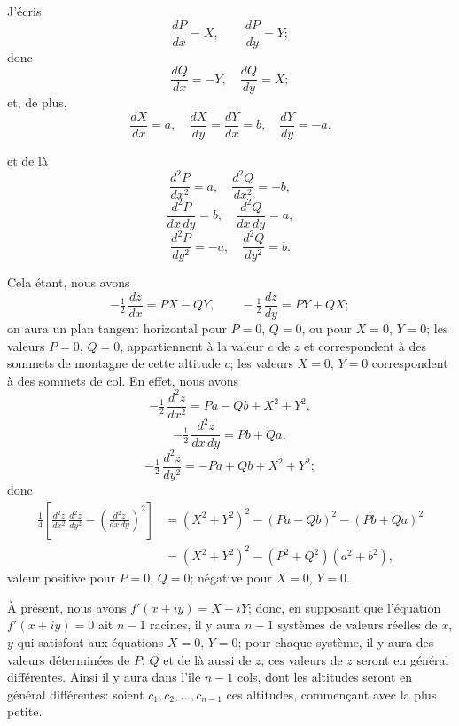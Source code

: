 \documentclass[11pt,a4paper]{article}
\begin{document}
J'écris
\[
\frac{dP}{dx} = X,\qquad \frac{dP}{dy} = Y;
\]
donc
\[
\frac{dQ}{dx} = -Y,\quad \frac{dQ}{dy} = X;
\]
et, de plus,
\[
\frac{dX}{dx} = a,\quad \frac{dX}{dy} = \frac{dY}{dx} = b,\quad \frac{dY}{dy} = -a.
\]

\noindent et de là
\[
\frac{d^2 P}{dx^2} = a,\quad \frac{d^2 Q}{dx^2} = -b,
\]
\[
\frac{d^2 P}{dx\,dy} = b,\quad \frac{d^2 Q}{dx\,dy} = a,
\]
\[
\frac{d^2 P}{dy^2} = -a,\quad \frac{d^2 Q}{dy^2} = b.
\]

Cela étant, nous avons
\[
-\tfrac{1}{2}\,\frac{dz}{dx} = PX - QY,\qquad -\tfrac{1}{2}\,\frac{dz}{dy} = PY + QX;
\]
on aura un plan tangent horizontal pour $P = 0$, $Q = 0$, ou pour $X = 0$, $Y = 0$; les valeurs $P = 0$, $Q = 0$, appartiennent à la valeur $c$ de $z$ et correspondent à des sommets de montagne de cette altitude $c$; les valeurs $X = 0$, $Y = 0$ correspondent à des sommets de col. En effet, nous avons
\[
-\tfrac{1}{2}\,\frac{d^2 z}{dx^2} = Pa - Qb + X^2 + Y^2,
\]
\[
-\tfrac{1}{2}\,\frac{d^2 z}{dx\,dy} = Pb + Qa,
\]
\[
-\tfrac{1}{2}\,\frac{d^2 z}{dy^2} = -Pa + Qb + X^2 + Y^2;
\]
donc
\begin{align*}
\tfrac{1}{4}\left[\frac{d^2 z}{dx^2}\,\frac{d^2 z}{dy^2} - \left(\frac{d^2 z}{dx\,dy}\right)^2\right] &= (X^2 + Y^2)^2 - (Pa - Qb)^2 - (Pb + Qa)^2\\
&= (X^2 + Y^2)^2 - (P^2 + Q^2)(a^2 + b^2),
\end{align*}
valeur positive pour $P = 0$, $Q = 0$; négative pour $X = 0$, $Y = 0$.

À présent, nous avons $f'(x + iy) = X - iY$; donc, en supposant que l'équation $f'(x + iy) = 0$ ait $n - 1$ racines, il y aura $n - 1$ systèmes de valeurs réelles de $x$, $y$ qui satisfont aux équations $X = 0$, $Y = 0$; pour chaque système, il y aura des valeurs déterminées de $P$, $Q$ et de là aussi de $z$; ces valeurs de $z$ seront en général différentes. Ainsi il y aura dans l'île $n - 1$ cols, dont les altitudes seront en général différentes: soient $c_1, c_2, \ldots, c_{n-1}$ ces altitudes, commençant avec la plus petite.
\end{document}
